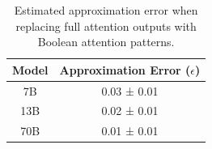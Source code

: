 \begin{table}[ht!]






\centering






\begin{tabular}{|c|c|}






\hline






Model & Approximation Error ($\epsilon$) \\






\hline






7B & 0.03 ± 0.01 \\






\hline






13B & 0.02 ± 0.01 \\






\hline






70B & 0.01 ± 0.01 \\






\hline






\end{tabular}






\caption{Estimated approximation error when replacing full attention outputs with Boolean attention patterns.}






\label{table:approx-error}






\end{table}













